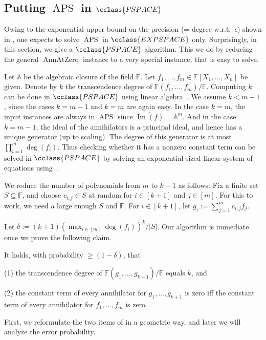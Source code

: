 \documentclass{toc}
\newcommand{\F}{\mathbb{F}}
\newcommand{\aff}{\mathbb{A}}
\DeclareMathOperator{\im}{\mathrm{Im}}
\newcommand{\PSPACE}{\cclass{PSPACE}\xspace}  %
\newcommand{\EXPSPACE}{\cclass{EXPSPACE}\xspace} %
\DeclareMathOperator{\APS}{\mathrm{APS}\xspace} %
\DeclareMathOperator{\AnnAtZero}{\mathrm{AnnAtZero}\xspace} %
\begin{document}
\subsection{Putting \texorpdfstring{$\APS$}{APS} in \texorpdfstring{$\PSPACE$}{PSPACE}}
%

Owing to the exponential upper bound on the precision (= degree w.r.t.\ $\epsilon$) shown in , one expects to solve $\APS$ in
%
$\EXPSPACE$   %
only. Surprisingly, in this section, we give a $\PSPACE$ algorithm. This we do by reducing the general $\AnnAtZero$ instance to a very special instance, that is easy to solve.

Let $\aff$ be the algebraic closure of the field $\F$. Let $f_1,\dots,f_m\in \F[X_1,\dots,X_n]$ be given. 
Denote by $k$ the transcendence degree of $\F(f_1,\dots,f_m)/\F$. Computing $k$ can be done in $\PSPACE$ using linear algebra~\cite{Plo05,C76,BGH82, Mul87}. 
We assume $k<m-1$, since the cases $k=m-1$ and $k=m$ are again easy. In the case $k=m$, the input instances are always in $\APS$ since $\overline{\im(f)}=\aff^m$. And in the case $k=m-1$, the ideal of the annihilators is a principal ideal, and hence has a unique generator (up to scaling). The degree of this generator is at most $\prod_{i=1}^m \deg(f_i)$. Thus checking whether it has a nonzero constant term can be solved in $\PSPACE$ by solving an exponential sized linear system of equations using~\cite{C76, BGH82, Mul87}. 

We reduce the number of polynomials from $m$ to $k+1$ as follows:
Fix a finite 
%
set %
$S\subseteq \F$,  and choose $c_{i,j}\in S$ at random for $i\in [k+1]$ and $j\in [m]$. For this to work, we need a large enough $S$ and $\F$.
For $i\in [k+1]$, let $g_i:= \sum_{j=1}^m c_{i,j} f_j$. 

Let  $\delta:= (k+1)(\max_{i\in [m]}\deg(f_i))^k/|S|$. Our algorithm is immediate once we prove the following claim.
%
\begin{theorem}\label{thm-randReduct}
It holds, with probability $\ge (1-\delta)$, that  

\smallskip\noindent
(1) the transcendence degree of $\F(g_1,\dots,g_{k+1})/\F$ equals $k$, and

\noindent
(2) the constant term of every annihilator for $g_1,\dots,g_{k+1}$ is zero  iff the constant term of  every annihilator for $f_1,\dots,f_{m}$ is zero.
\end{theorem}

First, we reformulate the two items of  in a geometric way, and later we will analyze the error probability.
\end{document}

